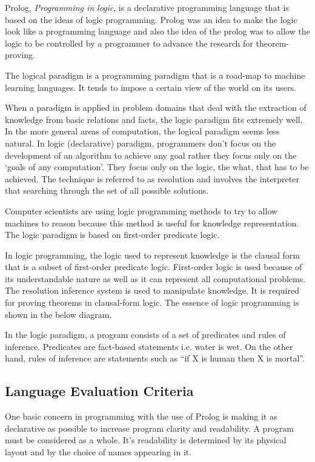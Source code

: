 \documentclass[a4paper, 12pt]{article}
\begin{document}
Prolog, \textit{Programming in logic}, is a declarative programming language that is based on the ideas of logic programming. Prolog was an idea to make the logic look like a programming language and also the idea of the prolog was to allow the logic to be controlled by a programmer to advance the research for theorem-proving.

The logical paradigm is a programming paradigm that is a road-map to machine learning languages. It tends to impose a certain view of the world on its users.

When a paradigm is applied in problem domains that deal with the extraction of knowledge from basic relations and facts, the logic paradigm fits extremely well. In the more general areas of computation, the logical paradigm seems less natural. In logic (declarative) paradigm, programmers don’t focus on the development of an algorithm to achieve any goal rather they focus only on the ‘goals of any computation’. They focus only on the logic, the what, that has to be achieved. The technique is referred to as resolution and involves the interpreter that searching through the set of all possible solutions.

Computer scientists are using logic programming methods to try to allow machines to reason because this method is useful for knowledge representation. The logic paradigm is based on first-order predicate logic.

In logic programming, the logic used to represent knowledge is the clausal form that is a subset of first-order predicate logic. First-order logic is used because of its understandable nature as well as it can represent all computational problems. The resolution inference system is used to manipulate knowledge. It is required for proving theorems in clausal-form logic. The essence of logic programming is shown in the below diagram.

In the logic paradigm, a program consists of a set of predicates and rules of inference. Predicates are fact-based statements i.e. water is wet. On the other hand, rules of inference are statements such as “if X is human then X is mortal”.
\subsection{Language Evaluation Criteria}
One basic concern in programming with the use of Prolog is making it as declarative as possible to increase program clarity and readability. A program must be considered as a whole. It's readability is determined by its physical layout and by the choice of names appearing in it.
\end{document}
